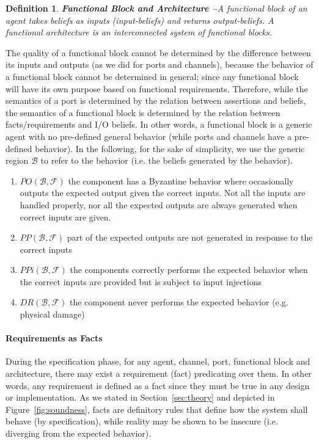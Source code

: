\documentclass[conference]{IEEEtran}
\newcommand{\beliefRegion}{\mathcal{B}}
\newcommand{\factRegion}{\mathcal{F}}
\newcommand{\pp}[2]{PP(#1,#2)}
\newcommand{\po}[2]{PO(#1,#2)}
\newcommand{\ppi}[2]{PPi(#1,#2)}
\newcommand{\dr}[2]{DR(#1,#2)}
\newtheorem{definition}{Definition}%
\begin{document}
\begin{definition}{\bf Functional Block and Architecture --}\label{def:funblock}
	A functional block of an agent takes beliefs as  inputs (input-beliefs) and
	returns output-beliefs.  A functional architecture is an
	interconnected system of functional blocks.
\end{definition}
The quality of a functional block cannot be determined
by the difference between its inputs and outputs (as we did for
ports and channels), because the behavior of a functional block
cannot be determined in general; since any functional block will have 
its own purpose based on functional requirements. 
Therefore, while the semantics of a port is determined by the relation 
between assertions and beliefs, the semantics of a functional block 
is determined by the relation between facts/requirements and I/O beliefs.
In other words, a functional block is a generic agent with no pre-defined general
behavior (while ports and channels have a pre-defined behavior).
In the following, for the sake of simplicity, 
we use the generic region $\beliefRegion$ to refer to the behavior (i.e.
the beliefs generated by the behavior).

\begin{enumerate}[start=50, label={W\arabic*)}]
	\item $\po{\beliefRegion}{\factRegion}$ the component has a Byzantine
		behavior where occasionally outputs the expected output given
		the correct inputs. Not all the inputs are handled properly,
		nor all the expected outputs are always generated when correct
		inputs are given.
	\item $\pp{\beliefRegion}{\factRegion}$ part of the expected outputs are not
	        generated in response to the correct
	        inputs
	\item $\ppi{\beliefRegion}{\factRegion}$ the components
	        correctly performs the expected behavior when the correct
	        inputs are provided but is subject to input
	        injections
	\item $\dr{\beliefRegion}{\factRegion}$ the component
		never performs the expected behavior (e.g. physical
		damage)
\end{enumerate}

\paragraph{Requirements as Facts}
During the specification phase, for any agent, channel, port, functional block
and architecture, there may exist a requirement (fact) predicating over them.
In other words, any requirement is defined as a fact since they must be true in
any design or implementation. As we stated in Section~\ref{sec:theory} and depicted in
Figure~\ref{fig:soundness}, facts are definitory rules that define how
the system shall behave (by specification), while reality may be shown to
be insecure (i.e. diverging from the expected behavior).
\end{document}
